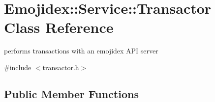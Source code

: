 \hypertarget{classEmojidex_1_1Service_1_1Transactor}{}\section{Emojidex\+:\+:Service\+:\+:Transactor Class Reference}
\label{classEmojidex_1_1Service_1_1Transactor}


performs transactions with an emojidex A\+PI server  




{\ttfamily \#include $<$transactor.\+h$>$}

\subsection*{Public Member Functions}
